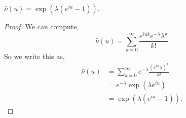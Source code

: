 \documentclass{unswmaths}
\begin{document}
\begin{lemma}
    $\hat{\nu}(u) = \exp(\lambda(e^{iu}-1))$.
\end{lemma}
\begin{proof}
    We can compute,
    \begin{equation*}
        \hat{\nu}(u) = \sum_{k=0}^\infty \frac{e^{iuk}e^{-\lambda}\lambda^k}{k!}
    \end{equation*}
    So we write this as,
    \begin{align*}
        \hat{\nu}(u) &= \sum_{k=0}^\infty e^{-\lambda} \frac{(e^{iu}\lambda)^k}{k!}\\
        &= e^{-\lambda} \exp(\lambda e^{iu})\\
        &= \exp(\lambda(e^{iu}-1)).
    \end{align*}
\end{proof}
\end{document}
